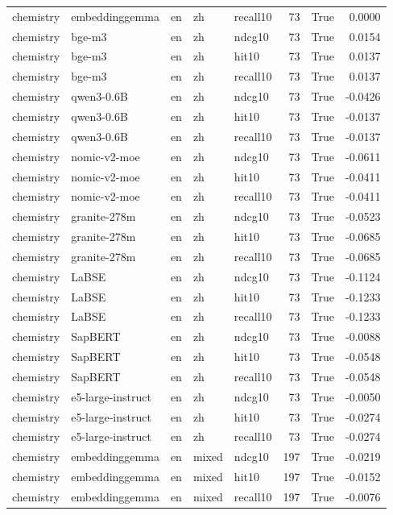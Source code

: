 \begin{tabular}{lllllrrr}
chemistry & embeddinggemma & en & zh & recall10 & 73 & True & 0.0000 \\
chemistry & bge-m3 & en & zh & ndcg10 & 73 & True & 0.0154 \\
chemistry & bge-m3 & en & zh & hit10 & 73 & True & 0.0137 \\
chemistry & bge-m3 & en & zh & recall10 & 73 & True & 0.0137 \\
chemistry & qwen3-0.6B & en & zh & ndcg10 & 73 & True & -0.0426 \\
chemistry & qwen3-0.6B & en & zh & hit10 & 73 & True & -0.0137 \\
chemistry & qwen3-0.6B & en & zh & recall10 & 73 & True & -0.0137 \\
chemistry & nomic-v2-moe & en & zh & ndcg10 & 73 & True & -0.0611 \\
chemistry & nomic-v2-moe & en & zh & hit10 & 73 & True & -0.0411 \\
chemistry & nomic-v2-moe & en & zh & recall10 & 73 & True & -0.0411 \\
chemistry & granite-278m & en & zh & ndcg10 & 73 & True & -0.0523 \\
chemistry & granite-278m & en & zh & hit10 & 73 & True & -0.0685 \\
chemistry & granite-278m & en & zh & recall10 & 73 & True & -0.0685 \\
chemistry & LaBSE & en & zh & ndcg10 & 73 & True & -0.1124 \\
chemistry & LaBSE & en & zh & hit10 & 73 & True & -0.1233 \\
chemistry & LaBSE & en & zh & recall10 & 73 & True & -0.1233 \\
chemistry & SapBERT & en & zh & ndcg10 & 73 & True & -0.0088 \\
chemistry & SapBERT & en & zh & hit10 & 73 & True & -0.0548 \\
chemistry & SapBERT & en & zh & recall10 & 73 & True & -0.0548 \\
chemistry & e5-large-instruct & en & zh & ndcg10 & 73 & True & -0.0050 \\
chemistry & e5-large-instruct & en & zh & hit10 & 73 & True & -0.0274 \\
chemistry & e5-large-instruct & en & zh & recall10 & 73 & True & -0.0274 \\
chemistry & embeddinggemma & en & mixed & ndcg10 & 197 & True & -0.0219 \\
chemistry & embeddinggemma & en & mixed & hit10 & 197 & True & -0.0152 \\
chemistry & embeddinggemma & en & mixed & recall10 & 197 & True & -0.0076 \\

\end{tabular}
